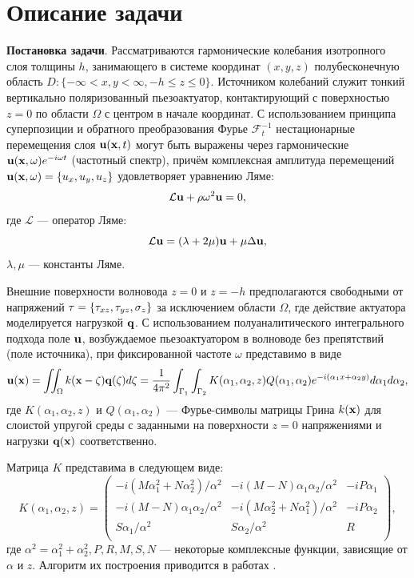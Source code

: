 \documentclass[a4paper, 12pt]{article}
\begin{document}
\section{Описание задачи}
{\bf Постановка задачи}. Рассматриваются гармонические колебания изотропного слоя толщины $h$,
занимающего в системе координат $(x, y, z)$ полубесконечную область
$D: \{ -\infty< x,y<\infty, -h \leq z \leq 0 \}$.
Источником колебаний служит тонкий вертикально поляризованный пьезоактуатор,
контактирующий с поверхностью $z = 0$ по области $\Omega$ с
центром в начале координат.
С использованием принципа суперпозиции и обратного преобразования Фурье
$\mathcal{F}_t^{-1}$ нестационарные перемещения слоя ${\bf u}({\bf x},t)$
могут быть выражены через гармонические ${\bf u}({\bf x},\omega)e^{-i \omega t}$ (частотный спектр),
причём комплексная амплитуда перемещений ${\bf u}({\bf x},\omega)=\{u_x,u_y,u_z \}$
удовлетворяет уравнению Ляме:
\begin{equation}
    \mathcal{L} {\bf u}+ \rho \omega^2 {\bf u}=0,
\end{equation}
где $\mathcal{L}$ --- оператор Ляме:
\begin{equation*}
    \mathcal{L} {\bf u}=(\lambda+2\mu){\bf u}+\mu \Delta {\bf u},
\end{equation*}
$\lambda, \mu$ --- константы Ляме.

Внешние поверхности волновода $z=0$ и $z=-h$ предполагаются свободными от напряжений
${\bf \tau}=\{\tau_{xz}, \tau_{yz}, \sigma_z \}$ за исключением области $\Omega$,
где действие актуатора моделируется нагрузкой ${\bf q}$. С использованием полуаналитического интегрального подхода
поле ${\bf u}$, возбуждаемое пьезоактуатором в волноводе без препятствий (поле источника), при фиксированной частоте $\omega$ представимо в виде
\begin{equation}
    {\bf u}({\bf x})= \iint_{\Omega} k({\bf x}-{\bf \zeta}) {\bf q}({\bf \zeta}) d {\bf \zeta}=
    \dfrac{1}{4 \pi^2} \int_{\Gamma_1}\int_{\Gamma_2} K(\alpha_1,\alpha_2,z) Q(\alpha_1,\alpha_2) e^{-i (\alpha_1 x+ \alpha_2 y)} d\alpha_1 d\alpha_2,
\label{u1}
\end{equation}
где $K(\alpha_1,\alpha_2,z)$ и $Q(\alpha_1,\alpha_2)$ --- Фурье-символы матрицы Грина $k({\bf x})$
для слоистой упругой среды с заданными на поверхности $z=0$ напряжениями и нагрузки ${\bf q}({\bf x})$ соответственно.

Матрица $K$ представима в следующем виде:
\begin{equation}
    K(\alpha_1, \alpha_2,z)=
\begin{pmatrix} 
    -i\left( M \alpha_1^2 +N \alpha_2^2\right)/\alpha^2 & -i(M-N)\alpha_1 \alpha_2 /\alpha^2&-iP\alpha_1\\ 
    -i(M-N)\alpha_1 \alpha_2 /\alpha^2& -i\left( M \alpha_2^2 +N \alpha_1^2\right) /\alpha^2&-iP\alpha_2\\
    S\alpha_1 /\alpha^2&S\alpha_2 /\alpha^2& R \\
\end{pmatrix},
\label{K1}
\end{equation}
где $\alpha^2=\alpha_1^2+\alpha_2^2, P,R,M,S,N$ --- некоторые комплексные функции, зависящие от $\alpha$ и $z$.
Алгоритм их построения приводится в работах \cite{g89,g90}.
\end{document}
